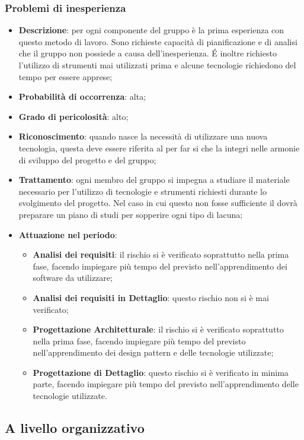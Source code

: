 		\subsubsection{Problemi di inesperienza}
		\begin{itemize}
			\item \textbf{Descrizione}: per ogni componente del gruppo è la prima esperienza con questo metodo di lavoro. Sono richieste capacità di pianificazione e di analisi che il gruppo non possiede a causa dell'inesperienza. \'E inoltre richiesto l'utilizzo di strumenti mai utilizzati prima e alcune tecnologie richiedono del tempo per essere apprese;
			\item \textbf{Probabilità di occorrenza}: alta;
			\item \textbf{Grado di pericolosità}: alto;
			\item \textbf{Riconoscimento}: quando nasce la necessità di utilizzare una nuova tecnologia, questa deve essere riferita al \textit{\Res} per far si che la integri nelle armonie di sviluppo del progetto e del gruppo; 
			\item \textbf{Trattamento}: ogni  membro del gruppo si impegna a studiare il materiale necessario per l'utilizzo di tecnologie e strumenti richiesti durante lo svolgimento del progetto. Nel caso in cui questo non fosse sufficiente il \textit{\Res} dovrà preparare un piano di studi per sopperire ogni tipo di lacuna;	
			\item \textbf{Attuazione nel periodo}:
			\begin{itemize}
				\item \textbf{Analisi dei requisiti}: il rischio si è verificato soprattutto nella prima fase, facendo impiegare più tempo del previsto nell'apprendimento dei software da utilizzare;
				\item \textbf{Analisi dei requisiti in Dettaglio}: questo rischio non si è mai verificato;
				\item \textbf{Progettazione Architetturale}: il rischio si è verificato soprattutto nella prima fase, facendo impiegare più tempo del previsto nell'apprendimento dei design pattern e delle tecnologie utilizzate; 
				\item \textbf{Progettazione di Dettaglio}: questo rischio si è verificato in minima parte, facendo impiegare più tempo del previsto nell'apprendimento delle tecnologie utilizzate.
			\end{itemize}
		\end{itemize}
	
	\subsection{A livello organizzativo}
		
